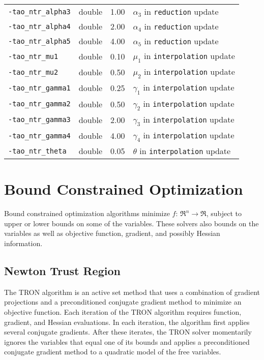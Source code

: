 \begin{table}[h]
\begin{tabular}{l|p{1.5in}|l|p{2.0in}}
{\tt -tao\_ntr\_alpha3} & double & 1.00 & $\alpha_3$ in {\tt reduction} update \\
{\tt -tao\_ntr\_alpha4} & double & 2.00 & $\alpha_4$ in {\tt reduction} update \\
{\tt -tao\_ntr\_alpha5} & double & 4.00 & $\alpha_5$ in {\tt reduction} update \\
{\tt -tao\_ntr\_mu1} & double & 0.10 & $\mu_1$ in {\tt interpolation} update \\
{\tt -tao\_ntr\_mu2} & double & 0.50 & $\mu_2$ in {\tt interpolation} update \\
{\tt -tao\_ntr\_gamma1} & double & 0.25 & $\gamma_1$ in {\tt interpolation} update \\
{\tt -tao\_ntr\_gamma2} & double & 0.50 & $\gamma_2$ in {\tt interpolation} update \\
{\tt -tao\_ntr\_gamma3} & double & 2.00 & $\gamma_3$ in {\tt interpolation} update \\
{\tt -tao\_ntr\_gamma4} & double & 4.00 & $\gamma_4$ in {\tt interpolation} update \\
{\tt -tao\_ntr\_theta} & double & 0.05 & $\theta$ in {\tt interpolation} update \\
\end{tabular}
\end{table}

\section{Bound Constrained Optimization}
\label{chapter:bound}

Bound constrained optimization algorithms
minimize $f: \, \Re^n \to \Re$, subject to upper or
lower bounds on some of the variables.
These solvers also bounds on the variables as well as objective
function, gradient, and possibly Hessian information.

\subsection{Newton Trust Region}\label{sec:tron}  
The TRON \cite{lin_c3} algorithm is an active set method that uses a 
combination of gradient projections and 
a preconditioned conjugate gradient method to minimize an objective function.
Each iteration of the TRON algorithm requires function, gradient, 
and Hessian evaluations.  In each iteration, the algorithm
first applies several conjugate
gradients.  
After these iterates, the TRON solver momentarily ignores the variables
that equal one of its bounds and
applies a preconditioned conjugate gradient method to a
quadratic model of the free variables.  


